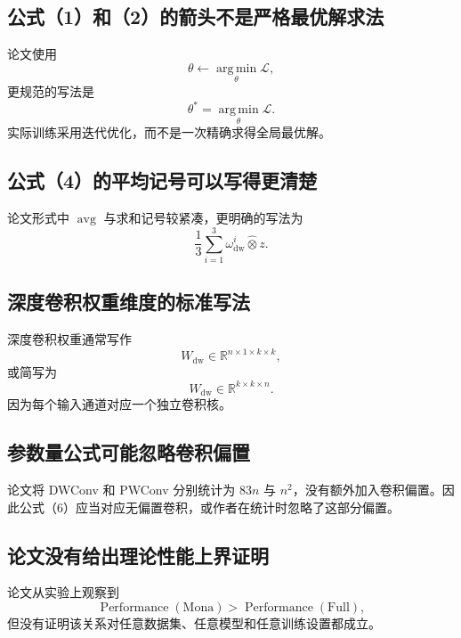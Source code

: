 \documentclass[UTF8,12pt,a4paper,fontset=none]{ctexart}
\newcommand{\Loss}{\mathcal{L}}
\newcommand{\R}{\mathbb{R}}
\newcommand{\avg}{\operatorname{avg}}
\newcommand{\argmin}{\operatorname*{arg\,min}}
\begin{document}
\subsection{公式（1）和（2）的箭头不是严格最优解求法}

论文使用
\begin{equation}
 \theta\leftarrow\argmin_{\theta}\Loss,
\end{equation}
更规范的写法是
\begin{equation}
 \theta^\ast=\argmin_{\theta}\Loss.
\end{equation}
实际训练采用迭代优化，而不是一次精确求得全局最优解。

\subsection{公式（4）的平均记号可以写得更清楚}

论文形式中 $\avg$ 与求和记号较紧凑，更明确的写法为
\begin{equation}
 \frac{1}{3}\sum_{i=1}^{3}
 \omega_{\mathrm{dw}}^i\widehat{\otimes}z.
\end{equation}

\subsection{深度卷积权重维度的标准写法}

深度卷积权重通常写作
\begin{equation}
 W_{\mathrm{dw}}\in\R^{n\times1\times k\times k},
\end{equation}
或简写为
\begin{equation}
 W_{\mathrm{dw}}\in\R^{k\times k\times n}.
\end{equation}
因为每个输入通道对应一个独立卷积核。

\subsection{参数量公式可能忽略卷积偏置}

论文将 DWConv 和 PWConv 分别统计为 $83n$ 与 $n^2$，没有额外加入卷积偏置。因此公式（6）应当对应无偏置卷积，或作者在统计时忽略了这部分偏置。

\subsection{论文没有给出理论性能上界证明}

论文从实验上观察到
\begin{equation}
 \operatorname{Performance}(\mathrm{Mona})
 >
 \operatorname{Performance}(\mathrm{Full}),
\end{equation}
但没有证明该关系对任意数据集、任意模型和任意训练设置都成立。
\end{document}

